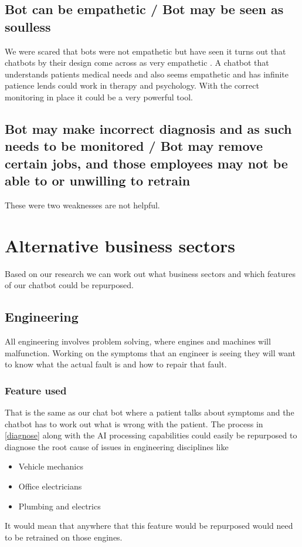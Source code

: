 \documentclass{article}
\begin{document}
\subsection{Bot can be empathetic / Bot may be seen as soulless}
We were scared that bots were not empathetic but have seen it turns out that chatbots by their design come across as very empathetic \cite{bedside}. A chatbot that understands patients medical needs and also seems empathetic and has infinite patience lends could work in therapy and psychology. With the correct monitoring in place it could be a very powerful tool. 

\subsection{Bot may make incorrect diagnosis and as such needs to be monitored / Bot may remove certain jobs, and those employees may not be able to or unwilling to retrain}
These were two weaknesses are not helpful.

\section{Alternative business sectors}
Based on our research we can work out what business sectors and which features of our chatbot could be repurposed.

\subsection{Engineering}
All engineering involves problem solving, where engines and machines will malfunction. Working on the symptoms that an engineer is seeing they will want to know what the actual fault is and how to repair that fault. 

\subsubsection{Feature used}
That is the same as our chat bot where a patient talks about symptoms and the chatbot has to work out what is wrong with the patient. The process  in \ref{diagnose} along with the AI processing capabilities could easily be repurposed to diagnose the root cause of issues in engineering disciplines like
\begin{itemize}
    \item Vehicle mechanics
    \item Office electricians
    \item Plumbing and electrics
\end{itemize}
It would mean that anywhere that this feature would be repurposed would need to be retrained on those engines.
\end{document}
